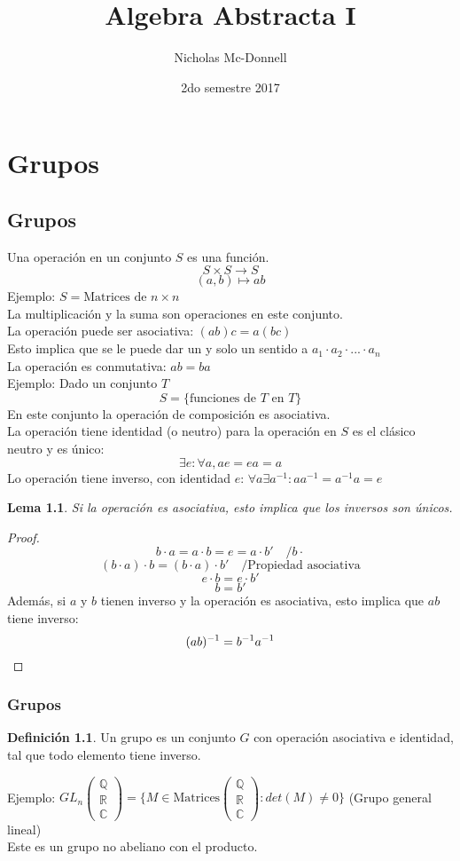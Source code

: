 \documentclass[11pt]{book}
\title{Algebra Abstracta I}
\author{Nicholas Mc-Donnell}
\date{2do semestre 2017}
\newtheorem{lem}[thm]{Lema}
\theoremstyle{definition}
\newtheorem{defn}{Definición}[section]
\begin{document}
\maketitle

\newpage
\tableofcontents

\newpage
{}
\chapter{Grupos}
\section{Grupos}
Una operación en un conjunto $S$ es una función.
\[
S\times S\rightarrow S
\]
\[
(a,b)\mapsto ab
\]
Ejemplo: $S= \textrm{Matrices de } n\times n$\\
La multiplicación y la suma son operaciones en este conjunto.\\
La operación puede ser asociativa: $(ab)c=a(bc)$\\
Esto implica que se le puede dar un y solo un sentido a $a_1\cdot a_2\cdot...\cdot a_n$\\
La operación es conmutativa: $ab=ba$\\
Ejemplo: Dado un conjunto $T$
\[S=\{ \textrm{funciones de } T\textrm{ en } T\}\]
En este conjunto la operación de composición es asociativa.\\
La operación tiene identidad (o neutro) para la operación en $S$ es el clásico neutro y es único:
\[
\exists e: \forall a, ae=ea=a
\]
Lo operación tiene inverso, con identidad $e$: $\forall a \exists a^{-1}: aa^{-1}=a^{-1}a=e$
\begin{lem}
Si la operación es asociativa, esto implica que los inversos son únicos.
\end{lem}
\begin{proof}

\[
b\cdot a =a\cdot b=e=a\cdot b'\quad / b\cdot
\]
\[
(b\cdot a)\cdot b=(b\cdot a)\cdot b' \quad /\textrm{Propiedad asociativa}
\]
\[
e\cdot b= e\cdot b'
\]
\[
b=b'
\]
Además, si $a$ y $b$ tienen inverso y la operación es asociativa, esto implica que $ab$ tiene inverso:
\[
(ab)^{-1}=b^{-1}a^{-1} \qedhere
\]
\end{proof}
\subsection{Grupos}
\begin{defn}
Un grupo es un conjunto $G$ con operación asociativa e identidad, tal que todo elemento tiene inverso.
\end{defn}
Ejemplo:  $GL_n\begin{pmatrix}\mathbb{Q} \\ \mathbb{R} \\ \mathbb{C} \end{pmatrix}=\{M\in\textrm{Matrices}\begin{pmatrix}\mathbb{Q} \\ \mathbb{R} \\ \mathbb{C} \end{pmatrix}:det(M)\neq 0\}$ (Grupo general lineal)\\
Este es un grupo no abeliano con el producto.
\end{document}
